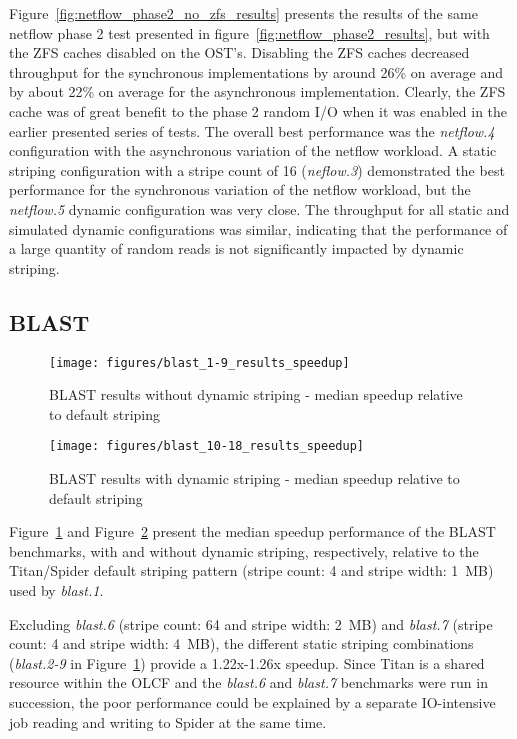\documentclass[conference,compsoc]{IEEEtran}
\begin{document}
Figure~\ref{fig:netflow_phase2_no_zfs_results} presents the results of the same netflow phase 2 test presented in figure~\ref{fig:netflow_phase2_results}, but with the ZFS caches disabled on the OST's. Disabling the ZFS caches decreased throughput for the synchronous implementations by around 26\% on average and by about 22\% on average for the asynchronous implementation. Clearly, the ZFS cache was of great benefit to the phase 2 random I/O when it was enabled in the earlier presented series of tests. The overall best performance was the \emph{netflow.4} configuration with the asynchronous variation of the netflow workload. A static striping configuration with a stripe count of 16 (\emph{neflow.3}) demonstrated the best performance for the synchronous variation of the netflow workload, but the \emph{netflow.5} dynamic configuration was very close. The throughput for all static and simulated dynamic configurations was similar, indicating that the performance of a large quantity of random reads is not significantly impacted by dynamic striping.

\subsection{BLAST}

\begin{figure}[t]
\centering
  \texttt{[image: figures/blast\_1-9\_results\_speedup]}
\caption{BLAST results without dynamic striping - median speedup relative to default striping}
\label{fig:blast_1-9_results}
\end{figure}

\begin{figure}[t]
\centering
  \texttt{[image: figures/blast\_10-18\_results\_speedup]}
\caption{BLAST results with dynamic striping - median speedup relative to default striping}
\label{fig:blast_10-18_results}
\end{figure}

Figure~\ref{fig:blast_1-9_results} and Figure~\ref{fig:blast_10-18_results} present the median speedup performance of the BLAST benchmarks, with and without dynamic striping, respectively, relative to the Titan/Spider default striping pattern (stripe count: 4 and stripe width: 1~MB) used by \emph{blast.1}. 

Excluding \emph{blast.6} (stripe count: 64 and stripe width: 2~MB) and \emph{blast.7} (stripe count: 4 and stripe width: 4~MB), the different static striping combinations (\emph{blast.2-9} in Figure~\ref{fig:blast_1-9_results}) provide a 1.22x-1.26x speedup. Since Titan is a shared resource within the OLCF and the \emph{blast.6} and \emph{blast.7} benchmarks were run in succession, the poor performance could be explained by a separate IO-intensive job reading and writing to Spider at the same time.
\end{document}
